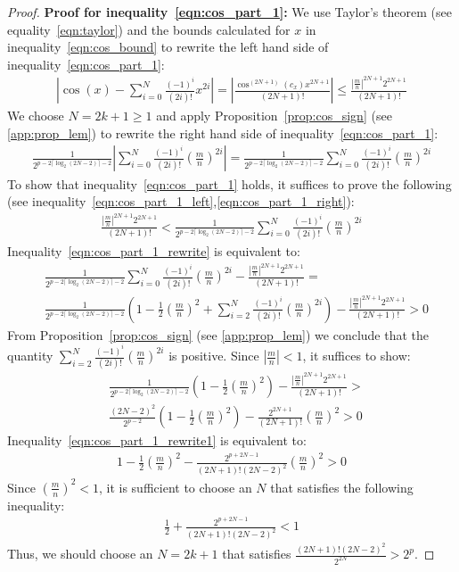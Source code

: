 \documentclass{article}
\numberwithin{mytheorem}{section}
\newcommand{\taylorcos}[3] {\sum_{i=#1}^{#2}\frac{(-1)^i}{(2i)!}{#3}^{2i}}
\begin{document}
\begin{proof}
\noindent \textbf{Proof for inequality~\eqref{eqn:cos_part_1}:} We use Taylor's theorem (see equality~\eqref{eqn:taylor}) and the bounds calculated for $x$  in inequality~\eqref{eqn:cos_bound} to rewrite the left hand side of inequality~\eqref{eqn:cos_part_1}:
\begin{align}
|\cos(x)-\taylorcos{0}{N}{x}|=|\frac{\cos^{(2N+1)}(c_x)x^{2N+1}}{(2N+1)!}|\leq \frac{|\frac{m}{n}|^{2N+1}2^{2N+1}}{(2N+1)!}\label{eqn:cos_part_1_left}
\end{align}
We choose $N=2k+1\geq 1$ and apply Proposition~\ref{prop:cos_sign} (see \ref{app:prop_lem}) to rewrite the right hand side of inequality~\eqref{eqn:cos_part_1}:
\begin{align}
\frac{1}{2^{p-2\lceil\log_2(2N-2)\rceil -2}}|\taylorcos{0}{N}{(\frac{m}{n})}|=\frac{1}{2^{p-2\lceil\log_2(2N-2)\rceil -2}}\taylorcos{0}{N}{(\frac{m}{n})}\label{eqn:cos_part_1_right}
\end{align}
To show that inequality~\eqref{eqn:cos_part_1} holds, it suffices to prove the following (see inequality~\eqref{eqn:cos_part_1_left},\eqref{eqn:cos_part_1_right}):
\begin{align}
\frac{|\frac{m}{n}|^{2N+1}2^{2N+1}}{(2N+1)!}<\frac{1}{2^{p-2\lceil\log_2(2N-2)\rceil -2}}\taylorcos{0}{N}{(\frac{m}{n})}\label{eqn:cos_part_1_rewrite}
\end{align}
Inequality~\eqref{eqn:cos_part_1_rewrite} is equivalent to:
\begin{align*}
&\frac{1}{2^{p-2\lceil\log_2(2N-2)\rceil -2}}\taylorcos{0}{N}{(\frac{m}{n})}-\frac{|\frac{m}{n}|^{2N+1}2^{2N+1}}{(2N+1)!}=\\
&\frac{1}{2^{p-2\lceil\log_2(2N-2)\rceil -2}}(1-\frac{1}{2}(\frac{m}{n})^2+\taylorcos{2}{N}{(\frac{m}{n})})-\frac{|\frac{m}{n}|^{2N+1}2^{2N+1}}{(2N+1)!}>0
\end{align*}
From Proposition~\ref{prop:cos_sign} (see \ref{app:prop_lem}) we conclude that the quantity $\taylorcos{2}{N}{(\frac{m}{n})}$ is positive. Since $|\frac{m}{n}|<1$, it suffices to show:
\begin{align}
&\frac{1}{2^{p-2\lceil\log_2(2N-2)\rceil -2}}(1-\frac{1}{2}(\frac{m}{n})^2)-\frac{|\frac{m}{n}|^{2N+1}2^{2N+1}}{(2N+1)!}>\nonumber \\
&\frac{(2N-2)^2}{2^{p -2}}(1-\frac{1}{2}(\frac{m}{n})^2)-\frac{2^{2N+1}}{(2N+1)!}(\frac{m}{n})^2>0\label{eqn:cos_part_1_rewrite1}
\end{align}
Inequality~\eqref{eqn:cos_part_1_rewrite1} is equivalent to:
\begin{align*}
1-\frac{1}{2}(\frac{m}{n})^2-\frac{2^{p+2N-1}}{(2N+1)!(2N-2)^2}(\frac{m}{n})^2>0
\end{align*}
Since $(\frac{m}{n})^2<1$, it is sufficient to choose an $N$ that satisfies the following inequality:
\begin{align*}
\frac{1}{2}+\frac{2^{p+2N-1}}{(2N+1)!(2N-2)^2}<1
\end{align*}
Thus, we should choose an $N=2k+1$ that satisfies $\frac{(2N+1)!(2N-2)^2}{2^{2N}}>2^p$.


\end{proof}
\end{document}
